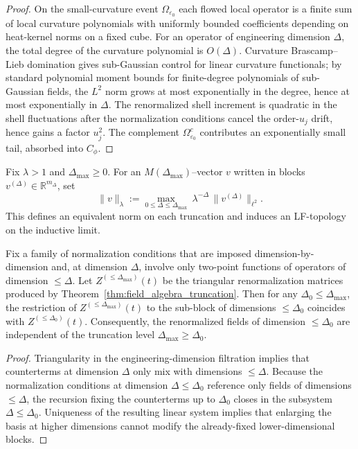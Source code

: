 \begin{proof}
On the small-curvature event $\Omega_{\varepsilon_0}$ each flowed local operator is a finite sum of local curvature polynomials with uniformly bounded
coefficients depending on heat-kernel norms on a fixed cube.
For an operator of engineering dimension $\Delta$, the total degree of the curvature polynomial is $O(\Delta)$.
Curvature Brascamp--Lieb domination gives sub-Gaussian control for linear curvature functionals; by standard polynomial moment bounds for finite-degree
polynomials of sub-Gaussian fields, the $L^2$ norm grows at most exponentially in the degree, hence at most exponentially in $\Delta$.
The renormalized shell increment is quadratic in the shell fluctuations after the normalization conditions cancel the order-$u_j$ drift, hence gains a
factor $u_j^2$.
The complement $\Omega_{\varepsilon_0}^c$ contributes an exponentially small tail, absorbed into $C_{\phi}$.
\end{proof}

\begin{definition}
\label{def:dimension_weighted_norm}
Fix $\lambda>1$ and $\Delta_{\max}\ge 0$.
For an $M(\Delta_{\max})$--vector $v$ written in blocks $v^{(\Delta)}\in\mathbb R^{m_{\Delta}}$, set
\begin{equation}\label{eq:weighted_norm}
 \|v\|_{\lambda}:=\max_{0\le \Delta\le \Delta_{\max}}\ \lambda^{-\Delta}\,\|v^{(\Delta)}\|_{\ell^2}.
\end{equation}
This defines an equivalent norm on each truncation and induces an LF-topology on the inductive limit.
\end{definition}

\begin{lemma}
\label{lem:coherent_Z}
Fix a family of normalization conditions that are imposed dimension-by-dimension and, at dimension $\Delta$, involve only two-point functions of
operators of dimension $\le \Delta$.
Let $Z^{(\le\Delta_{\max})}(t)$ be the triangular renormalization matrices produced by Theorem~\ref{thm:field_algebra_truncation}.
Then for any $\Delta_0\le \Delta_{\max}$, the restriction of $Z^{(\le\Delta_{\max})}(t)$ to the sub-block of dimensions $\le\Delta_0$ coincides with
$Z^{(\le\Delta_0)}(t)$.
Consequently, the renormalized fields of dimension $\le\Delta_0$ are independent of the truncation level $\Delta_{\max}\ge \Delta_0$.
\end{lemma}

\begin{proof}
Triangularity in the engineering-dimension filtration implies that counterterms at dimension $\Delta$ only mix with dimensions $\le\Delta$.
Because the normalization conditions at dimension $\Delta\le\Delta_0$ reference only fields of dimensions $\le\Delta$, the recursion fixing the
counterterms up to $\Delta_0$ closes in the subsystem $\Delta\le\Delta_0$.
Uniqueness of the resulting linear system implies that enlarging the basis at higher dimensions cannot modify the already-fixed lower-dimensional blocks.
\end{proof}

